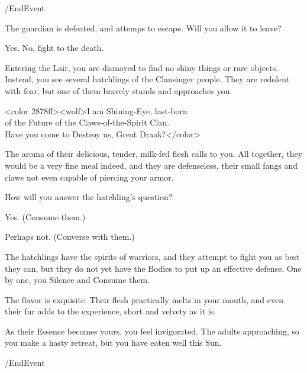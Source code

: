 \option /EndEvent
  


The guardian is defeated, and attemps to escape. Will you allow it to leave?

\option Yes.  
\option No, fight to the death. 



 
Entering the Lair, you are dismayed to find no shiny things or rare objects.
Instead, you see several hatchlings of the Clansinger people. They are redolent
with fear, but one of them bravely stands and approaches you.

<color 2878ff><wolf>I am Shining-Eye, last-born\\
of the Future of the Claws-of-the-Spirit Clan.\\
Have you come to Destroy us, Great Draak?</color>

The aroma of their delicious, tender, milk-fed flesh calls to you. All together,
they would be a very fine meal indeed, and they are defenseless, their small
fangs and claws not even capable of piercing your armor.

How will you answer the hatchling's question?

\option Yes. (Consume them.)
	  

\option Perhaps not. (Converse with them.) 


The hatchlings have the spirits of warriors, and they attempt to fight you as
best they can, but they do not yet have the Bodies to put up an effective
defense. One by one, you Silence and Consume them.

The flavor is exquisite. Their flesh practically melts in your mouth, and even
their fur adds to the experience, short and velvety as it is.

As their Essence becomes yours, you feel invigorated. The adults approaching, so
you make a hasty retreat, but you have eaten well this Sun.

\option /EndEvent  
 
   



